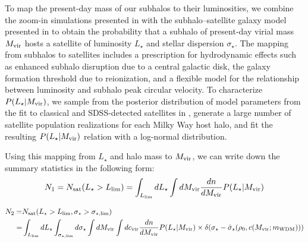 To map the present-day mass of our subhalos to their luminosities, we combine the zoom-in simulations presented in \cite{Mao2015} with the subhalo--satellite galaxy model presented in \cite{Nadler:2018} to obtain the probability that a subhalo of present-day virial mass $M_{\rm{vir}}$ hosts a satellite of luminosity $L_\star$ and stellar dispersion $\sigma_\star$. The mapping from subhalos to satellites includes a prescription for hydrodynamic effects such as enhanced subhalo disruption due to a central galactic disk, the galaxy formation threshold due to reionization, and a flexible model for the relationship between luminosity and subhalo peak circular velocity. To characterize $P(L_\star|M_{\rm{vir}})$, we sample from the posterior distribution of model parameters from the fit to classical and SDSS-detected satellites in \cite{Nadler:2018}, generate a large number of satellite population realizations for each Milky Way host halo, and fit the resulting $P(L_\star|M_{\rm{vir}})$ relation with a log-normal distribution.

Using this mapping from $L_\star$ and halo mass to $M_{\rm vir}$, we can write down the summary statistics in the following form:
\begin{equation}
    \begin{aligned}
    N_1 = N_{\rm sat}(L_\star>L_{\rm lim})= \int_{L_{\rm lim}} dL_\star \int dM_{\rm vir} \frac{dn}{d M_{\rm vir}} P(L_\star|M_{\rm vir}) \\
    \end{aligned}
\end{equation}

\begin{equation}
    \begin{aligned}
N_2 =& N_{\rm sat}(L_\star>L_{\rm lim}, \sigma_\star> \sigma_{\star,\rm lim}) \\ 
    =& \int_{L_{\rm lim}} dL_\star \int_{\sigma_{\star,\rm lim}} d\sigma_\star \int dM_{\rm vir} \int dc_{\rm vir} \frac{dn}{d M_{\rm vir}} P(L_\star|M_{\rm vir})
    \times  \delta(\sigma_\star-\bar{\sigma}_\star(\rho_0,c(M_{\rm vir};m_{\rm WDM})))
    \end{aligned}
\end{equation}

